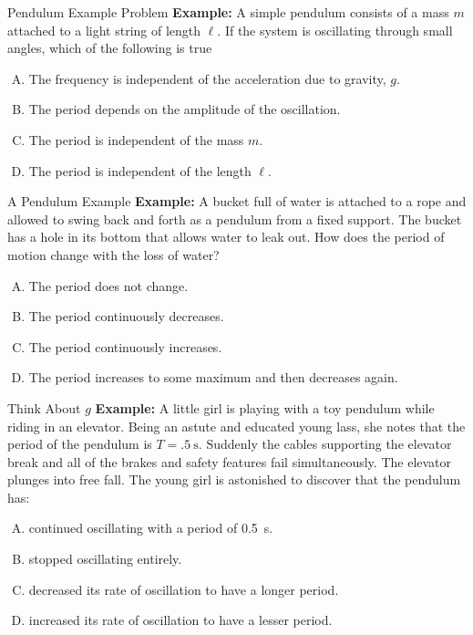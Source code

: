 \documentclass[12pt,compress,aspectratio=169]{beamer}
\begin{document}
\begin{frame}{Pendulum Example Problem}
  \textbf{Example:} A simple pendulum consists of a mass $m$ attached to a
  light string of length $\ell$. If the system is oscillating through small
  angles, which of the following is true
  \begin{enumerate}[(A)]
  \item The frequency is independent of the acceleration due to gravity, $g$.
  \item The period depends on the amplitude of the oscillation.
  \item The period is independent of the mass $m$.
  \item The period is independent of the length $\ell$.
  \end{enumerate}
\end{frame}



\begin{frame}{A Pendulum Example}
  \textbf{Example:} A bucket full of water is attached to a rope and allowed
  to swing back and forth as a pendulum from a fixed support. The bucket has a
  hole in its bottom that allows water to leak out. How does the period of
  motion change with the loss of water?
  \begin{enumerate}[(A)]
  \item The period does not change.
  \item The period continuously decreases.
  \item The period continuously increases.
  \item The period increases to some maximum and then decreases again.
  \end{enumerate}
\end{frame}



\begin{frame}{Think About $g$}
  \textbf{Example:} A little girl is playing with a toy pendulum while riding
  in an elevator. Being an astute and educated young lass, she notes that the 
  period of the pendulum is $T=\SI{.5}\second$. Suddenly the cables
  supporting the elevator break and all  of the brakes and safety features fail
  simultaneously. The elevator plunges into free fall. The young girl is
  astonished to discover that the pendulum has:
  \begin{enumerate}[(A)]
  \item continued oscillating with a period of \SI{.5}\second.
  \item stopped oscillating entirely.
  \item decreased its rate of oscillation to have a longer period.
  \item increased its rate of oscillation to have a lesser period.
  \end{enumerate}
\end{frame}
\end{document}
